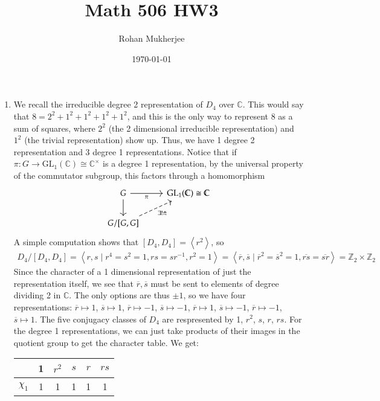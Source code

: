 \documentclass[12pt]{article}
\title{Math 506 HW3}
\date{\today}
\author{Rohan Mukherjee}
\theoremstyle{definitionstyle}
\def\mbb#1{\mathbb{#1}}
\def\C{\mbb{C}}
\newcommand{\Z}{\mbb Z}
\newcommand{\gen}[1]{\left\langle #1 \right\rangle}
\newcommand{\GL}{\mathrm{GL}}
\begin{document}
    \maketitle
    \begin{enumerate}
        \item We recall the irreducible degree 2 representation of $D_4$ over $\C$. This would say that $8 = 2^2 + 1^2 + 1^2 + 1^2 + 1^2$, and this is the only way to represent 8 as a sum of squares, where $2^2$ (the 2 dimensional irreducible representation) and $1^2$ (the trivial representation) show up. Thus, we have 1 degree 2 representation and 3 degree 1 representations. Notice that if $\pi: G \to \GL_1(\C) \cong \C^\times$ is a degree 1 representation, by the universal property of the commutator subgroup, this factors through a homomorphism
        \[\begin{tikzcd}
            G & {\GL_1(\C) \cong \C} \\
            {G/[G,G]}
            \arrow[from=1-1, to=2-1]
            \arrow["{\exists! \tilde \pi}"', dashed, from=2-1, to=1-2]
            \arrow["\pi"', from=1-1, to=1-2]
        \end{tikzcd}\]
        A simple computation shows that $[D_4, D_4] = \gen{r^2}$, so 
        \begin{align*}
            D_4/[D_4, D_4] = \gen{r, s \mid r^4 = s^2 = 1, rs = sr^{-1}, r^2=1} = \gen{\overline r, \overline s \mid \overline r^2 = \overline s^2 = 1, \overline{rs}= \overline{sr}} = \Z_2 \times \Z_2
        \end{align*}
        Since the character of a 1 dimensional representation of just the representation itself, we see that $\overline{r}, \overline s$ must be sent to elements of degree dividing 2 in $\C$. The only options are thus $\pm 1$, so we have four representations: $\overline r \mapsto 1$, $\overline s \mapsto 1$, $\overline r \mapsto -1$, $\overline s \mapsto -1$, $\overline r \mapsto 1$, $\overline s \mapsto -1$, $\overline r \mapsto -1$, $\overline s \mapsto 1$. The five conjugacy classes of $D_4$ are respresented by 1, $r^2$, $s$, $r$, $rs$. For the degree 1 representations, we can just take products of their images in the quotient group to get the character table. We get:
        \begin{center}
            \begin{tabular}{c|ccccc}
                & 1 & $r^2$ & $s$ & $r$ & $rs$ \\
                \hline
                $\chi_1$ & 1 & 1 & 1 & 1 & 1 \\

\end{tabular}
\end{center}
\end{enumerate}
\end{document}

